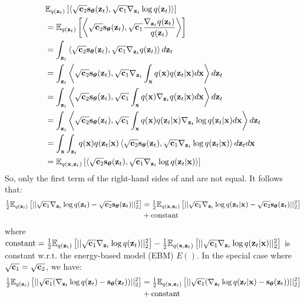 \documentclass{article}
\begin{document}
\begin{align}
&\E_{q(\rvz_t)} \left[ \langle \sqrt{\rvc_2}\snT(\rvz_t), \sqrt{\rvc_1}\nabla_{\rvz_t} \log q(\rvz_t) \rangle \right]\\
&= 
\E_{q(\rvz_t)} \left[ \left\langle \sqrt{\rvc_2} \snT(\rvz_t), \sqrt{\rvc_1} \frac{\nabla_{\rvz_t} q(\rvz_t)}{q(\rvz_t)} \right\rangle \right]\\
&= \int_{\rvz_t} \left\langle \sqrt{\rvc_2}\snT(\rvz_t), \sqrt{\rvc_1}\nabla_{\rvz_t} q(\rvz_t) \right\rangle d\rvz_t\\
&= \int_{\rvz_t} \left\langle \sqrt{\rvc_2}\snT(\rvz_t), \sqrt{\rvc_1}\nabla_{\rvz_t} \int_{\rvx} q(\rvx) q(\rvz_t|\rvx) d\rvx \right\rangle d\rvz_t\\
&= \int_{\rvz_t} \left\langle \sqrt{\rvc_2}\snT(\rvz_t), \sqrt{\rvc_1}\int_{\rvx} q(\rvx) \nabla_{\rvz_t} q(\rvz_t|\rvx) d\rvx \right\rangle d\rvz_t\\
&= \int_{\rvz_t} \left\langle \sqrt{\rvc_2}\snT(\rvz_t), \sqrt{\rvc_1}\int_{\rvx} q(\rvx) q(\rvz_t|\rvx) \nabla_{\rvz_t} \log q(\rvz_t|\rvx) d\rvx \right\rangle d\rvz_t\\
&= \int_{\rvx} \int_{\rvz_t} q(\rvx) q(\rvz_t|\rvx) \left\langle \sqrt{\rvc_2}\snT(\rvz_t), \sqrt{\rvc_1} \nabla_{\rvz_t} \log q(\rvz_t|\rvx) \right\rangle d\rvz_t d\rvx\\
&= \E_{q(\rvx,\rvz_t)} \left[ \left\langle \sqrt{\rvc_2}\snT(\rvz_t),  \sqrt{\rvc_1}\nabla_{\rvz_t} \log q(\rvz_t|\rvx) \right\rangle \right]
\label{eq:dsm_c}
\end{align}
So, only the first term of the right-hand sides of  and  are not equal. It follows that:
\begin{align}
\tfrac{1}{2} \E_{q(\rvz_t)} \left[ ||\sqrt{\rvc_1}\nabla_{\rvz_t} \log q(\rvz_t) - \sqrt{\rvc_2}\snT(\rvz_t)||_2^2 \right] &= \tfrac{1}{2} \E_{q(\rvx,\rvz_t)} \left[ ||\sqrt{\rvc_1}\nabla_{\rvz_t} \log q(\rvz_t|\rvx) - \sqrt{\rvc_2}\snT(\rvz_t)||_2^2 \right]\nonumber\\
&+ \text{constant}
\label{eq:dsm}\end{align}
where $\text{constant} = \tfrac{1}{2} \E_{q(\rvz_t)} \left[ ||\sqrt{\rvc_1}\nabla_{\rvz_t} \log q(\rvz_t)||_2^2 \right] - \tfrac{1}{2} \E_{q(\rvx,\rvz_t)} \left[ ||\sqrt{\rvc_1}\nabla_{\rvz_t} \log q(\rvz_t|\rvx)||_2^2 \right]$ is constant w.r.t. the energy-based model (EBM) $E()$. In the special case where $\sqrt{\rvc_1}=\sqrt{\rvc_2}$, we have:
\begin{align}
\tfrac{1}{2} \E_{q(\rvz_t)} \left[ ||\sqrt{\rvc_1}(\nabla_{\rvz_t} \log q(\rvz_t) - \snT(\rvz_t))||_2^2 \right] &= \tfrac{1}{2} \E_{q(\rvx,\rvz_t)} \left[ ||\sqrt{\rvc_1}(\nabla_{\rvz_t} \log q(\rvz_t|\rvx) - \snT(\rvz_t))||_2^2 \right]\nonumber\\
&+ \text{constant}
\label{eq:dsm2}\end{align}
\end{document}
